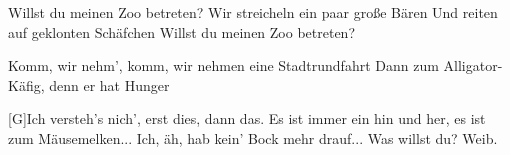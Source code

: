\begin{guitar}
	Willst du meinen Zoo betreten?
	Wir streicheln ein paar große Bären
	Und reiten auf geklonten Schäfchen
	Willst du meinen Zoo betreten?
	
	Komm, wir nehm', komm, wir nehmen eine Stadtrundfahrt 
	Dann zum Alligator-Käfig, denn er hat Hunger
	
	[G]Ich versteh's nich', erst dies, dann das. Es ist immer ein hin und her, es ist 
	zum Mäusemelken... Ich, äh, hab kein' Bock mehr drauf... Was willst du? 
	Weib.
\end{guitar}